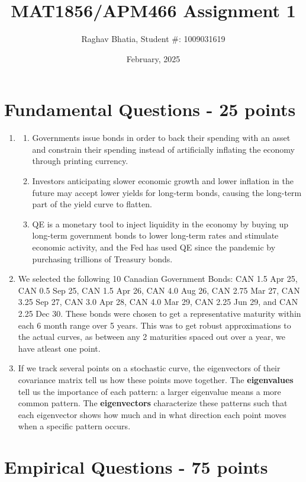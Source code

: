 \documentclass{article}
\title{MAT1856/APM466 Assignment 1}
\author{Raghav Bhatia, Student \#: 1009031619}
\date{February, 2025}
\begin{document}
\maketitle

\section*{Fundamental Questions - 25 points}

\begin{enumerate}
    \item \hfill
    \begin{enumerate}
        \item Governments issue bonds in order to back their spending with an asset and constrain their spending instead of artificially inflating the economy through printing currency.
        \item Investors anticipating slower economic growth and lower inflation in the future may accept lower yields for long-term bonds, causing the long-term part of the yield curve to flatten.
        \item QE is a monetary tool to inject liquidity in the economy by buying up long-term government bonds to lower long-term rates and stimulate economic activity, and the Fed has used QE since the pandemic by purchasing trillions of Treasury bonds.
    \end{enumerate}
    \item We selected the following 10 Canadian Government Bonds: CAN 1.5 Apr 25, CAN 0.5 Sep 25, CAN 1.5 Apr 26, CAN 4.0 Aug 26, CAN 2.75 Mar 27, CAN 3.25 Sep 27, CAN 3.0 Apr 28, CAN 4.0 Mar 29, CAN 2.25 Jun 29, and CAN 2.25 Dec 30. These bonds were chosen to get a representative maturity within each 6 month range over 5 years. This was to get robust approximations to the actual curves, as between any 2 maturities spaced out over a year, we have atleast one point.
    \item If we track several points on a stochastic curve, the eigenvectors of their covariance matrix tell us how these points move together.  The \textbf{eigenvalues} tell us the importance of each pattern: a larger eigenvalue means a more common pattern. The \textbf{eigenvectors} characterize these patterns such that each eigenvector shows how much and in what direction each point moves when a specific pattern occurs.
\end{enumerate}



\section*{Empirical Questions - 75 points}
\end{document}
